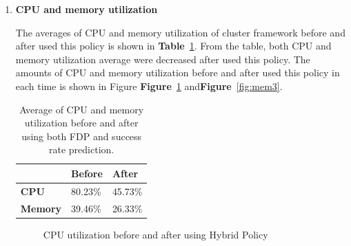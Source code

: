 \documentclass[12pt,oneside,openright,a4paper]{cpe-english-project}
\begin{document}
\begin{enumerate}
\newpage
  \item \textbf{CPU and memory utilization}
  
\hspace{10mm}The averages of CPU and memory utilization of cluster framework before and after used this policy is shown in \textbf{Table}~\ref{tbl:po3CPUMem}. From the table, both CPU and memory utilization average were decreased after used this policy. The amounts of CPU and memory utilization before and after used this policy in each time is shown in Figure \textbf{Figure}~\ref{fig:cpu3} and\textbf{Figure}~\ref{fig:mem3}.    

  \begin{table}[!h]
  \caption{Average of CPU and memory utilization before and after using both FDP and success rate prediction.}\label{tbl:po3CPUMem}
  \begin{tabular}{@{}|p{}|p{}|p{}|}
   \hline
   \textbf{} & \textbf{Before} & \textbf{After} \\ 
   \hline
   \textbf{CPU} & 80.23\% & 45.73\% \\ 
   \hline
   \textbf{Memory} & 39.46\% & 26.33\% \\ 
   \hline                     
  \end{tabular}
\end{table}

\begin{figure}[!h]\centering
    \setlength{\fboxrule}{0mm} %
    \setlength{\fboxsep}{0cm}
    \caption{CPU utilization before and after using Hybrid Policy}\label{fig:cpu3}
\end{figure}


\end{enumerate}
\end{document}
